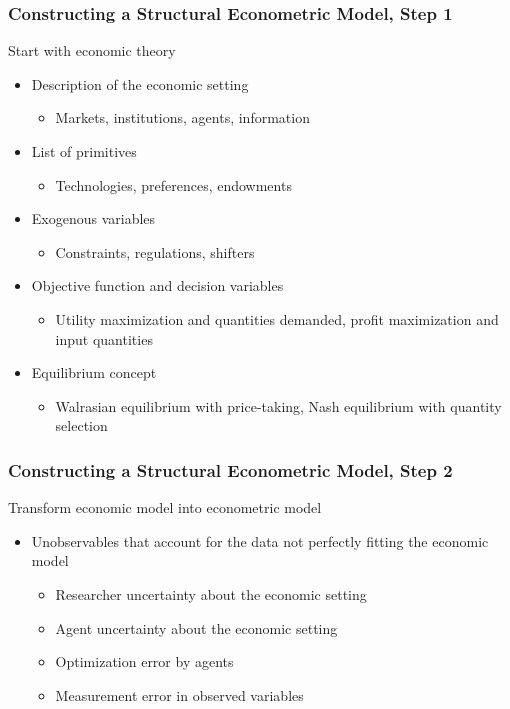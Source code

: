 \documentclass{beamer}
\begin{document}
\begin{frame}\frametitle{Constructing a Structural Econometric Model, Step 1}
    Start with economic theory
    \begin{itemize}
        \item Description of the economic setting
        \begin{itemize}
            \item Markets, institutions, agents, information
        \end{itemize}
        \item List of primitives
        \begin{itemize}
            \item Technologies, preferences, endowments
        \end{itemize}
        \item Exogenous variables
        \begin{itemize}
            \item Constraints, regulations, shifters
        \end{itemize}
        \item Objective function and decision variables
        \begin{itemize}
            \item Utility maximization and quantities demanded, profit maximization and input quantities
        \end{itemize}
        \item Equilibrium concept
        \begin{itemize}
            \item Walrasian equilibrium with price-taking, Nash equilibrium with quantity selection
        \end{itemize}
    \end{itemize}
\end{frame}

\begin{frame}\frametitle{Constructing a Structural Econometric Model, Step 2}
    Transform economic model into econometric model
    \begin{itemize}
        \item Unobservables that account for the data not perfectly fitting the economic model
        \begin{itemize}
            \item Researcher uncertainty about the economic setting
            \item Agent uncertainty about the economic setting
            \item Optimization error by agents
            \item Measurement error in observed variables
        \end{itemize}
    \end{itemize}
\end{frame}
\end{document}
